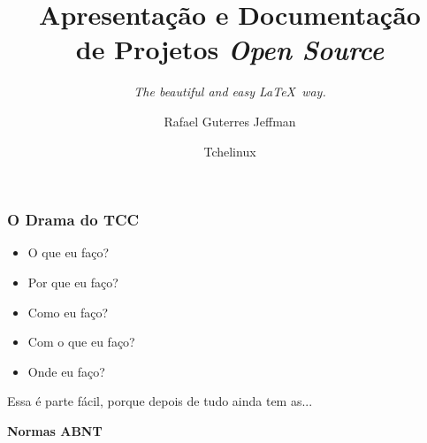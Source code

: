 \documentclass[aspect=43,14pt]{beamer}
\title[]{Apresentação e Documentação \\ de Projetos \emph{Open Source}}
\subtitle[]{\emph{The beautiful and easy \LaTeX\ way.}}
\author[]{Rafael Guterres Jeffman}
\institute[]{}
\date{Tchelinux}
\begin{document}
\begin{frame}
    \titlepage
\end{frame}

\begin{frame}[c]
    \frametitle{O Drama do TCC}
    \begin{itemize}
    \item{O que eu faço?}
    \item{Por que eu faço?}
    \item{Como eu faço?}
    \item{Com o que eu faço?}
    \item{Onde eu faço?}
    \end{itemize}
\end{frame}

\begin{frame}
    \vfill
    \begin{center}
    \large Essa é parte fácil, porque depois de tudo ainda tem as...
    \end{center}
\end{frame}

\begin{frame}[t]
    \vfill
    \begin{center}
    \color{white} \Huge \textbf{Normas ABNT}
    \end{center}
    \vfill
\end{frame}
\end{document}
